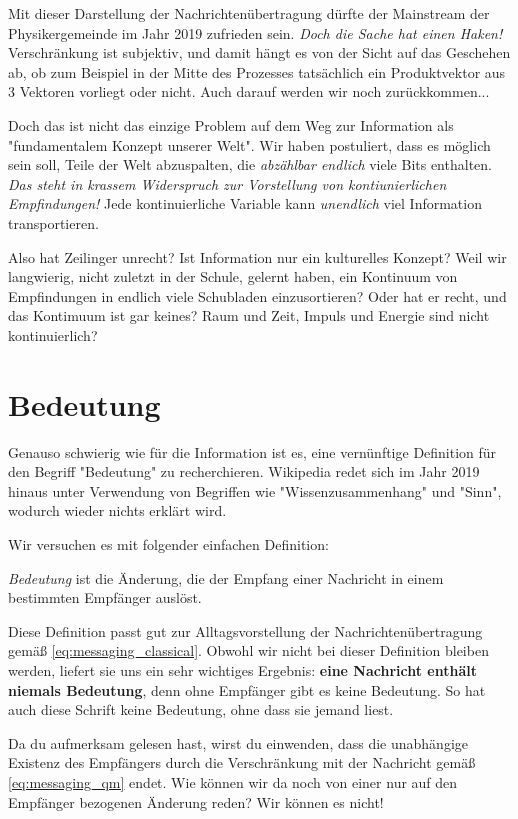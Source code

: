 \documentclass[12pt]{book}
\begin{document}
Mit dieser Darstellung der Nachrichtenübertragung dürfte der Mainstream der Physikergemeinde im Jahr 2019 zufrieden sein. \emph{Doch die Sache hat einen Haken!} Verschränkung ist subjektiv, und damit hängt es von der Sicht auf das Geschehen ab, ob zum Beispiel in der Mitte des Prozesses tatsächlich ein Produktvektor aus 3 Vektoren vorliegt oder nicht. Auch darauf werden wir noch zurückkommen...

Doch das ist nicht das einzige Problem auf dem Weg zur Information als "fundamentalem Konzept unserer Welt". Wir haben postuliert, dass es möglich sein soll, Teile der Welt abzuspalten, die \emph{abzählbar endlich} viele Bits enthalten. \emph{Das steht in krassem Widerspruch zur Vorstellung von kontiunierlichen Empfindungen!} Jede kontinuierliche Variable kann \emph{unendlich} viel Information transportieren. 

Also hat Zeilinger unrecht? Ist Information nur ein kulturelles Konzept? Weil wir langwierig, nicht zuletzt in der Schule, gelernt haben, ein Kontinuum von Empfindungen in endlich viele Schubladen einzusortieren? Oder hat er recht, und das Kontimuum ist gar keines? Raum und Zeit, Impuls und Energie sind nicht kontinuierlich?

\section{Bedeutung}

Genauso schwierig wie für die Information ist es, eine vernünftige Definition für den Begriff "Bedeutung" zu recherchieren. Wikipedia redet sich im Jahr 2019 hinaus unter Verwendung von Begriffen wie "Wissenzusammenhang" und "Sinn", wodurch wieder nichts erklärt wird. 

Wir versuchen es mit folgender einfachen Definition:

\emph{Bedeutung} ist die Änderung, die der Empfang einer Nachricht in einem bestimmten Empfänger auslöst. 

Diese Definition passt gut zur Alltagsvorstellung der Nachrichtenübertragung gemäß \eqref{eq:messaging_classical}. Obwohl wir nicht bei dieser Definition bleiben werden, liefert sie uns ein sehr wichtiges Ergebnis: \textbf{eine Nachricht enthält niemals Bedeutung}, denn ohne Empfänger gibt es keine Bedeutung. So hat auch diese Schrift keine Bedeutung, ohne dass sie jemand liest.

Da du aufmerksam gelesen hast, wirst du einwenden, dass die unabhängige Existenz des Empfängers durch die Verschränkung mit der Nachricht gemäß \eqref{eq:messaging_qm} endet. Wie können wir da noch von einer nur auf den Empfänger bezogenen Änderung reden? Wir können es nicht!
\end{document}
